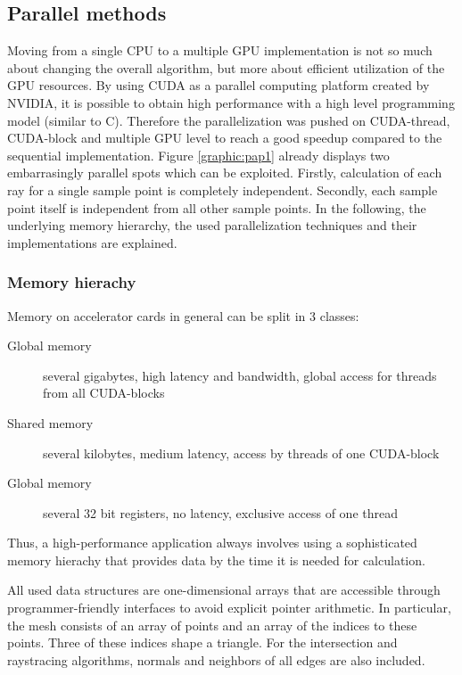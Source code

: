 \subsection{Parallel methods}
\label{subsec:parallel_methods}
Moving from a single CPU to a multiple
GPU implementation is not so much about changing the overall algorithm,
but more about efficient utilization of the GPU resources. 
By using CUDA\cite{cuda} as a parallel computing platform created by NVIDIA\cite{nvidia},
it is possible to obtain high performance with a high level 
programming model (similar to C). Therefore the parallelization was pushed on CUDA-thread, 
CUDA-block and multiple GPU level to reach a good speedup compared to 
the sequential implementation. 
Figure \ref{graphic:pap1} already displays two embarrasingly parallel spots
which can be exploited. Firstly, calculation of each ray for a single sample
point is completely independent. Secondly, each sample point itself is
independent from all other sample points. 
In the following, the underlying memory hierarchy, the used parallelization
techniques and their implementations are explained.

\subsubsection{Memory hierachy}
Memory on accelerator cards in general can be split
in 3 classes: 
\begin{description}
  \item[Global memory] several gigabytes, high latency and bandwidth, global access for threads from all CUDA-blocks
  \item[Shared memory] several kilobytes, medium latency, access by threads of one CUDA-block
  \item[Global memory] several 32 bit registers, no latency, exclusive access of one thread
\end{description}

Thus, a high-performance application always involves using
a sophisticated memory hierachy that provides data by
the time it is needed for calculation.

All used data structures are one-dimensional 
arrays that are accessible through programmer-friendly interfaces to avoid
explicit pointer arithmetic.
In particular, the mesh consists of an array of points and an array of the indices
to these points. Three of these indices shape a triangle.
For the intersection and raystracing algorithms, normals and neighbors
of all edges are also included. 

